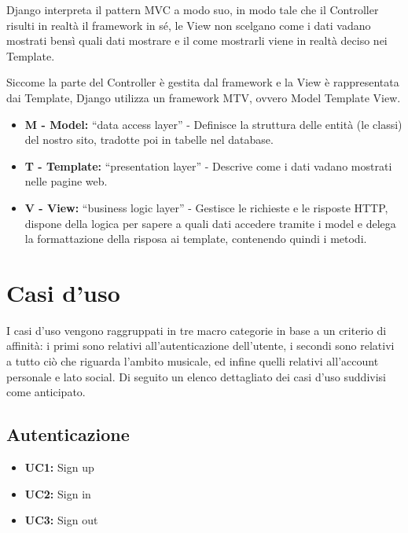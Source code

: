 Django interpreta il pattern MVC a modo suo, in modo tale che il Controller risulti in 
realtà il framework in sé, le View non scelgano come i dati vadano mostrati bensì quali 
dati mostrare e il come mostrarli viene in realtà deciso nei Template.

Siccome la parte del Controller è gestita dal framework e la View è rappresentata dai Template, Django 
utilizza un framework MTV, ovvero Model Template View.
    

   
\begin{itemize}
    \item \textbf{M - Model:} “data access layer” - Definisce la struttura delle entità (le classi) del nostro sito, tradotte 
    poi in tabelle nel database.
    \item \textbf{T - Template:} “presentation layer” - Descrive come i dati vadano mostrati nelle pagine web.
    \item \textbf{V - View:} “business logic layer” - Gestisce le richieste e le risposte HTTP, dispone della 
    logica per sapere a quali dati accedere tramite i model e delega la formattazione della risposa ai template, contenendo quindi i metodi. 
\end{itemize}
    
    
\newpage

\section{Casi d'uso}
I casi d'uso vengono raggruppati in tre macro categorie in base a un criterio di affinità:
i primi sono relativi all'autenticazione dell'utente, i secondi sono relativi a tutto
ciò che riguarda l'ambito musicale, ed infine quelli relativi all'account personale e lato social. 
Di seguito un elenco dettagliato dei casi d'uso suddivisi come anticipato.

\subsection{Autenticazione}
    \begin{itemize}
        \item \textbf{UC1:} Sign up 
        \item \textbf{UC2:} Sign in
        \item \textbf{UC3:} Sign out 
    \end{itemize}


